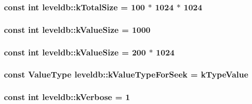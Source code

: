 \hypertarget{namespaceleveldb_aef708b670e7c242e59bd3b0c9fb19fe5}{
\subsubsection[{k\-Total\-Size}]{\setlength{\rightskip}{0pt plus 5cm}const int leveldb\-::k\-Total\-Size = 100 $\ast$ 1024 $\ast$ 1024\hspace{0.3cm}{\ttfamily [static]}}}\label{namespaceleveldb_aef708b670e7c242e59bd3b0c9fb19fe5}
\hypertarget{namespaceleveldb_a193cc831a2200dd1c5e6aee70d6654d3}{
\subsubsection[{k\-Value\-Size}]{\setlength{\rightskip}{0pt plus 5cm}const int leveldb\-::k\-Value\-Size = 1000\hspace{0.3cm}{\ttfamily [static]}}}\label{namespaceleveldb_a193cc831a2200dd1c5e6aee70d6654d3}
\hypertarget{namespaceleveldb_a193cc831a2200dd1c5e6aee70d6654d3}{
\subsubsection[{k\-Value\-Size}]{\setlength{\rightskip}{0pt plus 5cm}const int leveldb\-::k\-Value\-Size = 200 $\ast$ 1024\hspace{0.3cm}{\ttfamily [static]}}}\label{namespaceleveldb_a193cc831a2200dd1c5e6aee70d6654d3}
\hypertarget{namespaceleveldb_a0b7840e7de67fb0f7905955c02f75cfa}{
\subsubsection[{k\-Value\-Type\-For\-Seek}]{\setlength{\rightskip}{0pt plus 5cm}const {\bf Value\-Type} leveldb\-::k\-Value\-Type\-For\-Seek = {\bf k\-Type\-Value}\hspace{0.3cm}{\ttfamily [static]}}}\label{namespaceleveldb_a0b7840e7de67fb0f7905955c02f75cfa}
\hypertarget{namespaceleveldb_af8897be0086c2db6e31344b7679c170a}{
\subsubsection[{k\-Verbose}]{\setlength{\rightskip}{0pt plus 5cm}const int leveldb\-::k\-Verbose = 1\hspace{0.3cm}{\ttfamily [static]}}}\label{namespaceleveldb_af8897be0086c2db6e31344b7679c170a}
